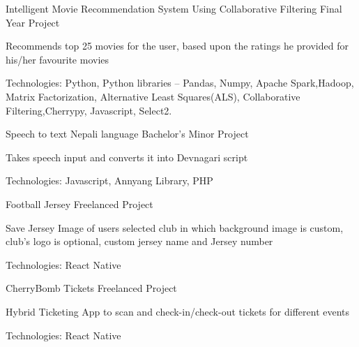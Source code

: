 
\begin{cventries}
  \cventry
    {} %
    {Intelligent Movie Recommendation System Using Collaborative Filtering} %
    {Final Year Project} %
    {} %
    {
      \begin{cvitems} %
        \item {Recommends top 25 movies for the user, based upon the ratings he provided for his/her favourite movies}
        \item {Technologies: Python, Python libraries – Pandas, Numpy, Apache Spark,Hadoop, Matrix Factorization, Alternative Least Squares(ALS), Collaborative Filtering,Cherrypy, Javascript, Select2.}
      \end{cvitems}
    }

  \cventry
    {} %
    {Speech to text Nepali language} %
    {Bachelor's Minor Project} %
    {} %
    {
      \begin{cvitems} %
      	\item {Takes speech input and converts it into Devnagari script}
      	 \item {Technologies: Javascript, Annyang Library, PHP}
      \end{cvitems}
    }
    
  \cventry
    {} %
    {Football Jersey} %
    {Freelanced Project} %
    {} %
    {
      \begin{cvitems} %
      	\item {Save Jersey Image of users selected club in which background image is custom, club's logo is optional, custom jersey name and Jersey number}
      	\item { Technologies: React Native }
      \end{cvitems}
    }
    
  \cventry
    {} %
    {CherryBomb Tickets} %
    {Freelanced Project} %
    {} %
    {
      \begin{cvitems} %
      	\item {Hybrid Ticketing App to scan and check-in/check-out tickets for different events}
      	\item { Technologies: React Native }
      \end{cvitems}
    }
    

\end{cventries}
